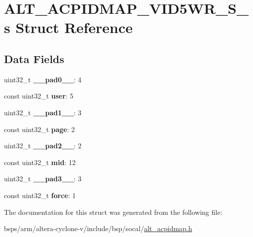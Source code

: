 \hypertarget{structALT__ACPIDMAP__VID5WR__S__s}{}\section{A\+L\+T\+\_\+\+A\+C\+P\+I\+D\+M\+A\+P\+\_\+\+V\+I\+D5\+W\+R\+\_\+\+S\+\_\+s Struct Reference}
\label{structALT__ACPIDMAP__VID5WR__S__s}
\subsection*{Data Fields}
\begin{DoxyCompactItemize}
\item 
\mbox{\label{structALT__ACPIDMAP__VID5WR__S__s_ac0f0f7ce41b0e65654a9558d2d4cc804}} 
uint32\+\_\+t {\bfseries \+\_\+\+\_\+pad0\+\_\+\+\_\+}\+: 4
\item 
\mbox{\label{structALT__ACPIDMAP__VID5WR__S__s_aa711fb9b5025a32aa23df9c60f79db5b}} 
const uint32\+\_\+t {\bfseries user}\+: 5
\item 
\mbox{\label{structALT__ACPIDMAP__VID5WR__S__s_ad46d0db9f8f4d922b147c62babc5fe7c}} 
uint32\+\_\+t {\bfseries \+\_\+\+\_\+pad1\+\_\+\+\_\+}\+: 3
\item 
\mbox{\label{structALT__ACPIDMAP__VID5WR__S__s_a7c8fb2272bbfe94d089dc8a14d506434}} 
const uint32\+\_\+t {\bfseries page}\+: 2
\item 
\mbox{\label{structALT__ACPIDMAP__VID5WR__S__s_a5146b2152633145e513d5b1a2196b72f}} 
uint32\+\_\+t {\bfseries \+\_\+\+\_\+pad2\+\_\+\+\_\+}\+: 2
\item 
\mbox{\label{structALT__ACPIDMAP__VID5WR__S__s_a8087508ef13495993f0c3e1a4d0d6b24}} 
const uint32\+\_\+t {\bfseries mid}\+: 12
\item 
\mbox{\label{structALT__ACPIDMAP__VID5WR__S__s_ae01285be96a855efd85de6e2ac36b5c3}} 
uint32\+\_\+t {\bfseries \+\_\+\+\_\+pad3\+\_\+\+\_\+}\+: 3
\item 
\mbox{\label{structALT__ACPIDMAP__VID5WR__S__s_a75eb82ff5f1fcce6e4b3648138966701}} 
const uint32\+\_\+t {\bfseries force}\+: 1
\end{DoxyCompactItemize}


The documentation for this struct was generated from the following file\+:\begin{DoxyCompactItemize}
\item 
bsps/arm/altera-\/cyclone-\/v/include/bsp/socal/\mbox{\hyperlink{alt__acpidmap_8h}{alt\+\_\+acpidmap.\+h}}\end{DoxyCompactItemize}
